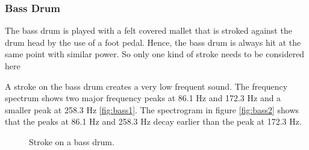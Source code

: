 


\subsubsection{Bass Drum}

The bass drum is played with a felt covered mallet that is stroked against the drum head by the use of a foot pedal. Hence, the bass drum is always hit at the same point with similar power. So only one kind of stroke needs to be considered here

A stroke on the bass drum creates a very low frequent sound. The frequency spectrum shows two major frequency peaks at 86.1 Hz and 172.3 Hz and a smaller peak at 258.3 Hz \ref{fig:bass1}. The spectrogram in figure \ref{fig:bass2} shows that the peaks at 86.1 Hz and 258.3 Hz decay earlier than the peak at 172.3 Hz. 

\begin{figure}[hbp]
	\centering
	\qquad
	\caption{Stroke on a bass drum.}
	\label{fig:bass}
\end{figure}


